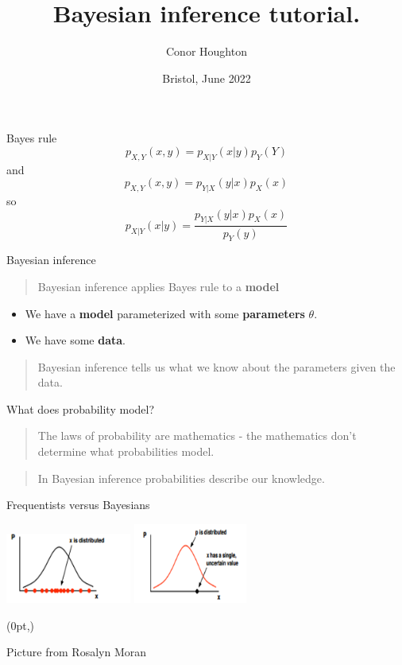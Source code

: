 \documentclass{beamer}
\title[Bayesian inference tutorial.]{Bayesian inference tutorial.}
\author{Conor Houghton}
\institute{U Bristol}
\date{Bristol, June 2022}
\newcommand\FrameText[1]{%
  \begin{textblock*}{\paperwidth}(0pt,\textheight)
    \raggedright #1\hspace{.5em}
  \end{textblock*}}
\newcommand{\crish}{\color{reddish}}
\newcommand{\cbla}{\color{black}}
\newcommand{\sm}{\color{reddish}$}
\newcommand{\fm}{$\color{black}{}}
\begin{document}
\maketitle

\begin{frame}{Bayes rule}
  \crish
  $$p_{X,Y}(x,y)=p_{X|Y}(x|y)p_Y(Y)$$
  \cbla
  and
  \crish
  $$p_{X,Y}(x,y)=p_{Y|X}(y|x)p_X(x)$$
  \cbla
  so
  \crish
  $$p_{X|Y}(x|y)=\frac{p_{Y|X}(y|x)p_X(x)}{p_Y(y)}$$
  \cbla
  \end{frame}

\begin{frame}{Bayesian inference}
  \begin{quote}Bayesian inference applies Bayes rule to a \textbf{model}\end{quote}
  \begin{itemize}
  \item We have a \textbf{model} parameterized with some \textbf{parameters} \sm \theta\fm{}.
  \item We have some \textbf{data}.
  \end{itemize}
  \begin{quote} Bayesian inference tells us what we know about the parameters given the data.\end{quote}
\end{frame}



\begin{frame}{What does probability model?}
  \begin{quote}
    The laws of probability are mathematics - the mathematics don't determine what probabilities model.
  \end{quote}
    \begin{quote}
    In Bayesian inference probabilities describe our knowledge.
  \end{quote}
\end{frame}

\begin{frame}{Frequentists versus Bayesians}
  \begin{center}
\includegraphics[width=4.125cm]{fig_freq.png}
\includegraphics[width=3.75cm]{fig_bayes.png}
\end{center}
  \FrameText{\tiny{Picture from Rosalyn Moran}}  
\end{frame}
\end{document}
